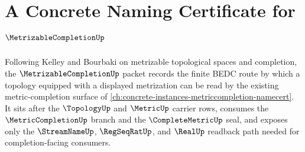 \chapter{A Concrete Naming Certificate for $\MetrizableCompletionUp$}
\label{ch:concrete-instances-metrizable-completion-namecert}

Following Kelley and Bourbaki on metrizable topological spaces and completion, the $\MetrizableCompletionUp$ packet records the finite BEDC route by which a topology equipped with a displayed metrization can be read by the existing metric-completion surface of \autoref{ch:concrete-instances-metriccompletion-namecert}. It sits after the $\TopologyUp$ and $\MetricUp$ carrier rows, consumes the $\MetricCompletionUp$ branch and the $\CompleteMetricUp$ seal, and exposes only the $\StreamNameUp$, $\RegSeqRatUp$, and $\RealUp$ readback path needed for completion-facing consumers.

